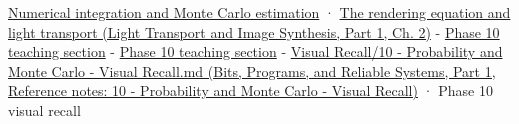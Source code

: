\hypertarget{appendix-031e02bf28af-full-teaching-explanation}{}

\hyperref[03-visual-computing-i-ch012-numerical-integration-and-monte-carlo-estimation]{Numerical integration and Monte Carlo estimation} · \href{../04-Light-Transport-and-Image-Synthesis-P01/main.pdf\#nameddest=03-visual-computing-i-ch007-the-rendering-equation-and-light-transport}{The rendering equation and light transport (Light Transport and Image Synthesis, Part 1, Ch. 2)} - \hyperref[02-foundations-ii-ch030-monte-carlo-estimates-trade-computation-for-uncertainty]{Phase 10 teaching section} - \hyperref[02-foundations-ii-ch029-transformations-turn-simple-inputs-into-useful-samples]{Phase 10 teaching section} - \href{../01-Bits-Programs-and-Reliable-Systems-P01/main.pdf\#nameddest=appendix-cb5af353ef77}{Visual Recall/10 - Probability and Monte Carlo - Visual Recall.md (Bits, Programs, and Reliable Systems, Part 1, Reference notes: 10 - Probability and Monte Carlo - Visual Recall)} · Phase 10 visual recall

